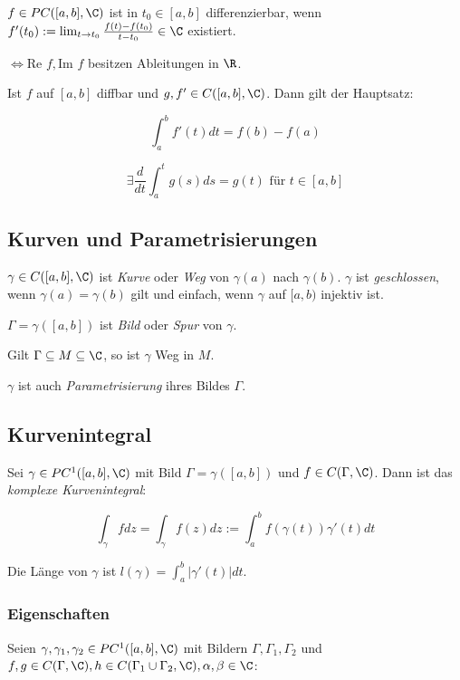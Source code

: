 \(f \in PC([a,b],\C)\) ist in \(t_0 \in [a,b]\) differenzierbar, wenn \(f'(t_0) := \lim_{t \to t_0} \frac{f(t)-f(t_0)}{t-t_0} \in \C\) existiert.

			\(\iff \text{Re } f, \text{Im } f\) besitzen Ableitungen in \(\R\).

Ist \(f\) auf \([a,b]\) diffbar und \(g, f' \in C([a,b],\C)\). Dann gilt der Hauptsatz:

\vspace*{-3mm}
\[ \int_a^b f'(t) dt = f(b) - f(a) \]

\[ \exists \frac{d}{dt} \int_a^t g(s) ds = g(t) \text{ für } t \in [a,b] \]

\subsection*{Kurven und Parametrisierungen}

\(\gamma \in C([a,b],\C)\) ist \emph{Kurve} oder \emph{Weg} von \(\gamma(a)\) nach \(\gamma(b)\). \(\gamma\) ist \emph{geschlossen}, wenn \(\gamma(a)=\gamma(b)\) gilt und einfach, wenn \(\gamma\) auf \([a,b)\) injektiv ist.

							\(\Gamma = \gamma([a,b])\) ist \emph{Bild} oder \emph{Spur} von \(\gamma\).

Gilt \(\Gamma \subseteq M \subseteq \C\), so ist \(\gamma\) Weg in \(M\).

			\(\gamma\) ist auch \emph{Parametrisierung} ihres Bildes \(\Gamma\).

\subsection*{Kurvenintegral}

Sei \(\gamma \in PC^1([a,b],\C)\) mit Bild \(\Gamma = \gamma([a,b])\) und \(f \in C(\Gamma,\C)\). Dann ist das \emph{komplexe Kurvenintegral}:

\vspace*{-2mm}
\[ \int_\gamma f dz = \int_\gamma f(z) dz := \int_a^b f(\gamma(t))\gamma'(t) dt \]

Die Länge von \(\gamma\) ist \(l(\gamma) = \int_a^b |\gamma'(t)| dt\).

\subsubsection*{Eigenschaften}

Seien \(\gamma, \gamma_1, \gamma_2 \in PC^1([a,b],\C)\) mit Bildern \(\Gamma, \Gamma_1, \Gamma_2\) und \(f, g \in C(\Gamma,\C), h \in C(\Gamma_1 \cup \Gamma_2, \C), \alpha, \beta \in \C\):

